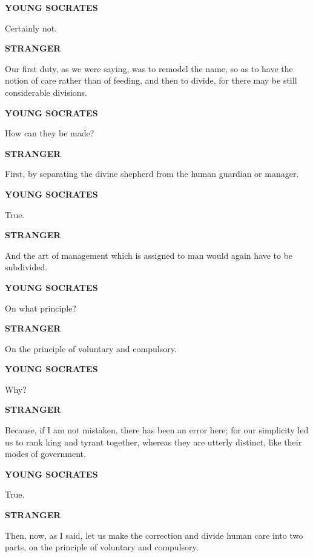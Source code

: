 \documentclass[11pt,letter]{article}
\begin{document}
\par \textbf{YOUNG SOCRATES}
\par   Certainly not.

\par \textbf{STRANGER}
\par   Our first duty, as we were saying, was to remodel the name, so as to have the notion of care rather than of feeding, and then to divide, for there may be still considerable divisions.

\par \textbf{YOUNG SOCRATES}
\par   How can they be made?

\par \textbf{STRANGER}
\par   First, by separating the divine shepherd from the human guardian or manager.

\par \textbf{YOUNG SOCRATES}
\par   True.

\par \textbf{STRANGER}
\par   And the art of management which is assigned to man would again have to be subdivided.

\par \textbf{YOUNG SOCRATES}
\par   On what principle?

\par \textbf{STRANGER}
\par   On the principle of voluntary and compulsory.

\par \textbf{YOUNG SOCRATES}
\par   Why?

\par \textbf{STRANGER}
\par   Because, if I am not mistaken, there has been an error here; for our simplicity led us to rank king and tyrant together, whereas they are utterly distinct, like their modes of government.

\par \textbf{YOUNG SOCRATES}
\par   True.

\par \textbf{STRANGER}
\par   Then, now, as I said, let us make the correction and divide human care into two parts, on the principle of voluntary and compulsory.
\end{document}
